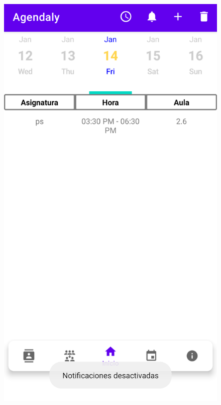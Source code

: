 \documentclass[a4paper,openright,12pt]{article}
\begin{document}
\begin{figure}
        \includegraphics[scale=0.05]{notificacion6.png} 

\end{figure}
\end{document}
